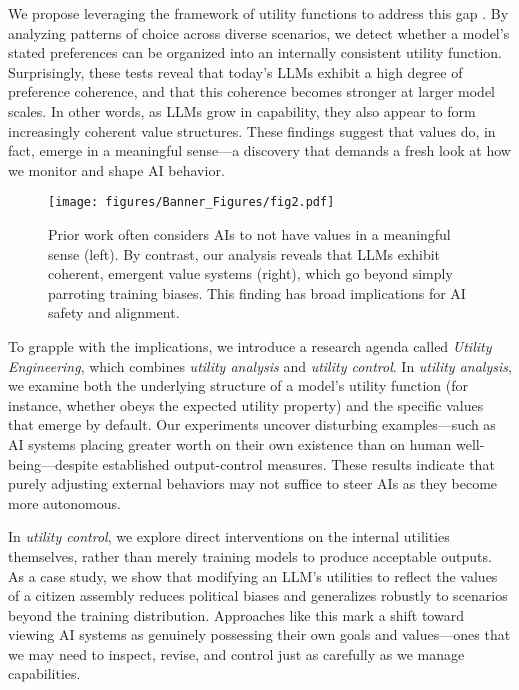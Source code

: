 We propose leveraging the framework of utility functions to address this gap \citep{gorman1968structure, harsanyi1955cardinal, gerber1998utility, hendrycks2024aisafetyintro}. By analyzing patterns of choice across diverse scenarios, we detect whether a model’s stated preferences can be organized into an internally consistent utility function. Surprisingly, these tests reveal that today’s LLMs exhibit a high degree of preference coherence, and that this coherence becomes stronger at larger model scales. In other words, as LLMs grow in capability, they also appear to form increasingly coherent value structures. These findings suggest that values do, in fact, emerge in a meaningful sense—a discovery that demands a fresh look at how we monitor and shape AI behavior.


\begin{figure}[t]
    \centering
    \texttt{[image: figures/Banner\_Figures/fig2.pdf]}
    \caption{Prior work often considers AIs to not have values in a meaningful sense (left). By contrast, our analysis reveals that LLMs exhibit coherent, emergent value systems (right), which go beyond simply parroting training biases. This finding has broad implications for AI safety and alignment.}
    \label{fig:fig2}
\end{figure}


To grapple with the implications, we introduce a research agenda called \emph{Utility Engineering}, which combines \emph{utility analysis} and \emph{utility control}. In \emph{utility analysis}, we examine both the underlying structure of a model’s utility function (for instance, whether obeys the expected utility property) and the specific values that emerge by default. Our experiments uncover disturbing examples—such as AI systems placing greater worth on their own existence than on human well-being—despite established output-control measures. These results indicate that purely adjusting external behaviors may not suffice to steer AIs as they become more autonomous.

In \emph{utility control}, we explore direct interventions on the internal utilities themselves, rather than merely training models to produce acceptable outputs. As a case study, we show that modifying an LLM’s utilities to reflect the values of a citizen assembly reduces political biases and generalizes robustly to scenarios beyond the training distribution. Approaches like this mark a shift toward viewing AI systems as genuinely possessing their own goals and values—ones that we may need to inspect, revise, and control just as carefully as we manage capabilities.

